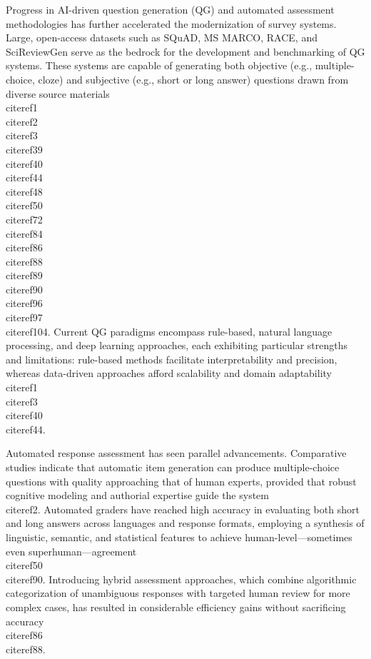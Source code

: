 \documentclass[11pt]{article}
\begin{document}
Progress in AI-driven question generation (QG) and automated assessment methodologies has further accelerated the modernization of survey systems. Large, open-access datasets such as SQuAD, MS MARCO, RACE, and SciReviewGen serve as the bedrock for the development and benchmarking of QG systems. These systems are capable of generating both objective (e.g., multiple-choice, cloze) and subjective (e.g., short or long answer) questions drawn from diverse source materials~\\cite{ref1}\\cite{ref2}\\cite{ref3}\\cite{ref39}\\cite{ref40}\\cite{ref44}\\cite{ref48}\\cite{ref50}\\cite{ref72}\\cite{ref84}\\cite{ref86}\\cite{ref88}\\cite{ref89}\\cite{ref90}\\cite{ref96}\\cite{ref97}\\cite{ref104}. Current QG paradigms encompass rule-based, natural language processing, and deep learning approaches, each exhibiting particular strengths and limitations: rule-based methods facilitate interpretability and precision, whereas data-driven approaches afford scalability and domain adaptability~\\cite{ref1}\\cite{ref3}\\cite{ref40}\\cite{ref44}.

Automated response assessment has seen parallel advancements. Comparative studies indicate that automatic item generation can produce multiple-choice questions with quality approaching that of human experts, provided that robust cognitive modeling and authorial expertise guide the system~\\cite{ref2}. Automated graders have reached high accuracy in evaluating both short and long answers across languages and response formats, employing a synthesis of linguistic, semantic, and statistical features to achieve human-level—sometimes even superhuman—agreement~\\cite{ref50}\\cite{ref90}. Introducing hybrid assessment approaches, which combine algorithmic categorization of unambiguous responses with targeted human review for more complex cases, has resulted in considerable efficiency gains without sacrificing accuracy~\\cite{ref86}\\cite{ref88}.
\end{document}
